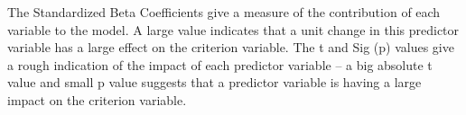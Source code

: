 \documentclass[a4paper,12pt]{article}
\begin{document}
The Standardized Beta
Coefficients give a measure of the
contribution of each variable to
the model. A large value indicates
that a unit change in this
predictor variable has a large
effect on the criterion variable.
The t and Sig (p) values give a
rough indication of the impact of
each predictor variable – a big
absolute t value and small p value
suggests that a predictor variable
is having a large impact on the
criterion variable.

%
%
%
%
%
\end{document}
